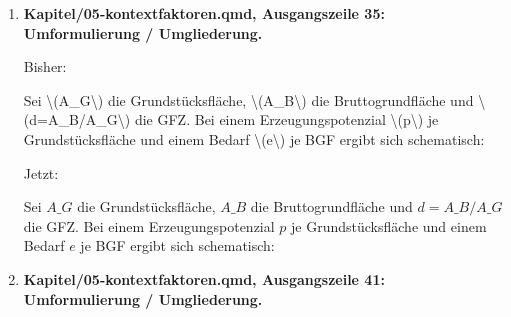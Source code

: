 \documentclass[
  ngerman,
  a4paper,
  DIV=11]{scrreprt}
\newenvironment{Shaded}{\begin{snugshade}}{\end{snugshade}}
\newcommand{\NormalTok}[1]{\textcolor[rgb]{0.00,0.23,0.31}{#1}}
\begin{document}
\begin{enumerate}
  Jetzt:

\begin{Shaded}
\begin{Highlighting}[]
\NormalTok{| $k$, $A\_\{k,j\}\^{}\{2040\}$ | Gebäudetyp und Fläche nach GFZ{-}Klasse | Aus @sec{-}gebaeudebestand |}
\NormalTok{| $e\_k$, $p\_k$ | Typologiebezogener Energiebedarf und lokale Erzeugung | Gelieferte PV30/noFlex{-}Kennwerte in @sec{-}gebaeudesektormodell |}
\NormalTok{| $b\_\{k,j\}\^{}\{\textbackslash{}mathrm\{ref\}\}$ | Modellierter Referenzsaldo für Nicht{-}PEQ{-}Klassen | Aus Szenarioannahmen zu bestimmen |}
\NormalTok{| $t\_\{k,j\}\^{}\{\textbackslash{}mathrm\{PEQ\}\}$ | Zu kalibrierender Mindestbeitrag für PEQ{-}Klassen | Neu zu kalibrieren |}
\NormalTok{| $c\_\{\textbackslash{}mathrm\{S\},k\}$ | **Typologiespezifische Sanierungsanpassung** für die jeweils berechtigte PEQ{-}Klasse | Neu zu kalibrieren |}
\NormalTok{| $c\_\{\textbackslash{}mathrm\{D\}\}(d;\textbackslash{}theta)$ | Dichteabhängige Zielwertkorrektur | Neu zu kalibrieren |}
\NormalTok{| $\textbackslash{}theta$ | Parameter der Lastenverteilung und gegebenenfalls weitere Nebenbedingungen | Gemeinsam festzulegen |}
\end{Highlighting}
\end{Shaded}
\item
  \textbf{Kapitel/05-kontextfaktoren.qmd, Ausgangszeile 35:
  Umformulierung / Umgliederung.}

  Bisher:

\begin{Shaded}
\begin{Highlighting}[]
\NormalTok{Sei \textbackslash{}(A\_G\textbackslash{}) die Grundstücksfläche, \textbackslash{}(A\_B\textbackslash{}) die Bruttogrundfläche und \textbackslash{}(d=A\_B/A\_G\textbackslash{}) die GFZ. Bei einem Erzeugungspotenzial \textbackslash{}(p\textbackslash{}) je Grundstücksfläche und einem Bedarf \textbackslash{}(e\textbackslash{}) je BGF ergibt sich schematisch:}
\end{Highlighting}
\end{Shaded}

  Jetzt:

\begin{Shaded}
\begin{Highlighting}[]
\NormalTok{Sei $A\_G$ die Grundstücksfläche, $A\_B$ die Bruttogrundfläche und $d=A\_B/A\_G$ die GFZ. Bei einem Erzeugungspotenzial $p$ je Grundstücksfläche und einem Bedarf $e$ je BGF ergibt sich schematisch:}
\end{Highlighting}
\end{Shaded}
\item
  \textbf{Kapitel/05-kontextfaktoren.qmd, Ausgangszeile 41:
  Umformulierung / Umgliederung.}


\end{enumerate}
\end{document}
